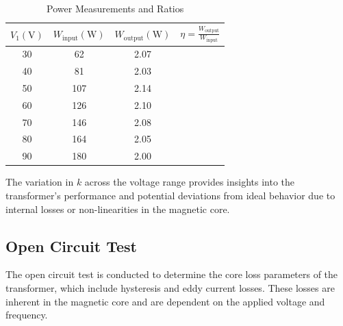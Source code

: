 \documentclass[12pt,a4paper]{report}
\begin{document}
\begin{table}[H]
    \centering
    \caption{Power Measurements and Ratios}
    \begin{tabular}{|c|c|c|c|}
    \hline
    $V_1 (\text{V})$ & $W_{\text{input}} (\text{W})$ & $W_{\text{output}} (\text{W})$ & $\eta = \frac{W_{\text{output}}}{W_{\text{input}}}$ \\ \hline
    30 & 62  & 2.07 \\ \hline
    40 & 81  & 2.03 \\ \hline
    50 & 107 & 2.14 \\ \hline
    60 & 126 & 2.10 \\ \hline
    70 & 146 & 2.08 \\ \hline
    80 & 164 & 2.05 \\ \hline
    90 & 180 & 2.00 \\ \hline
    \end{tabular}
    \end{table}
    

The variation in \( k \) across the voltage range provides insights into the transformer's performance and potential deviations from ideal behavior due to internal losses or non-linearities in the magnetic core.

\subsection{Open Circuit Test}
The open circuit test is conducted to determine the core loss parameters of the transformer, which include hysteresis and eddy current losses. These losses are inherent in the magnetic core and are dependent on the applied voltage and frequency.
\end{document}
